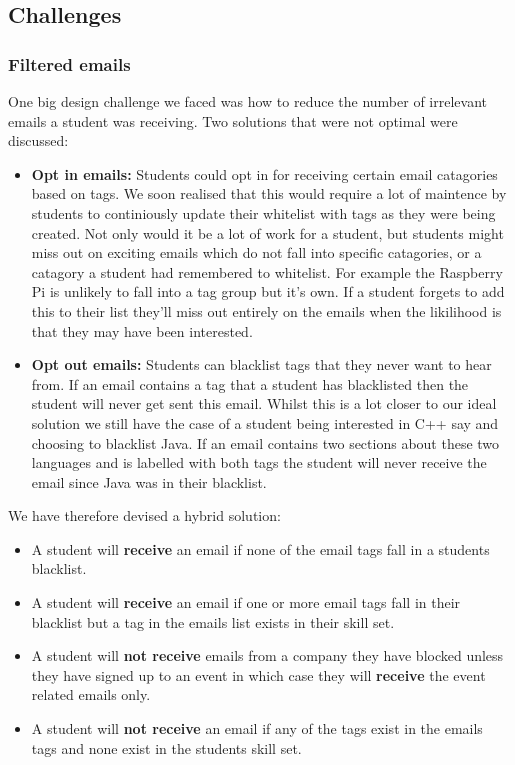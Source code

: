 \subsection{Challenges}
  \subsubsection{Filtered emails}
    One big design challenge we faced was how to reduce the number of irrelevant emails a student was receiving. Two solutions that were not optimal were discussed:
    \begin{itemize}
      \item \textbf{Opt in emails:} Students could opt in for receiving certain email catagories based on tags. We soon realised that this would require a lot of maintence by students to continiously update their whitelist with tags as they were being created.
      Not only would it be a lot of work for a student, but students might miss out on exciting emails which do not fall into specific catagories, or a catagory a student had remembered to whitelist. For example the Raspberry Pi is unlikely to fall into a tag group but it's own. If a student forgets to add this to their list they'll miss out entirely on the emails when the likilihood is that they may have been interested.
      \item \textbf{Opt out emails:} Students can blacklist tags that they never want to hear from. If an email contains a tag that a student has blacklisted then the student will never get sent this email. Whilst this is a lot closer to our ideal solution we still have the case of a student being interested in C++ say and choosing to blacklist Java. If an email contains two sections about these two languages and is labelled with both tags the student will never receive the email since Java was in their blacklist.
    \end{itemize}

    We have therefore devised a hybrid solution:
    \begin{itemize}
      \item A student will \textbf{receive} an email if none of the email tags fall in a students blacklist.
      \item A student will \textbf{receive} an email if one or more email tags fall in their blacklist but a tag in the emails list exists in their skill set.
      \item A student will \textbf{not receive} emails from a company they have blocked unless they have signed up to an event in which case they will \textbf{receive} the event related emails only.
      \item A student will \textbf{not receive} an email if any of the tags exist in the emails tags and none exist in the students skill set.
    \end{itemize}

